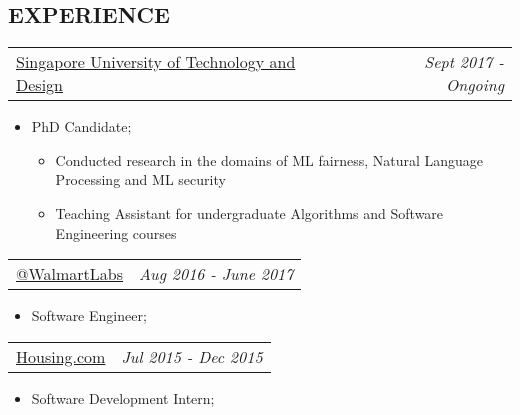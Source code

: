 \documentclass[margin]{res}
\begin{document}
\begin{resume}
\section{EXPERIENCE}

 \begin{tabular}{p{4.2in} r} 
                    \href{https://www.sutd.edu.sg}{Singapore University of Technology and Design} &  \textit{Sept 2017 - Ongoing} 
                    \end{tabular}
                     \begin{itemize}
                        \item[] PhD Candidate;
                        \begin{itemize}
                       \item[] Conducted research in the domains of ML fairness, Natural Language Processing and ML security
                       \item[] Teaching Assistant for undergraduate Algorithms and Software Engineering courses                                             
                        \end{itemize}
                     \end{itemize}

                    \begin{tabular}{p{4.2in} r} 
                    \href{http://www.walmartlabs.com/}{@WalmartLabs} &  \textit{Aug 2016 - June 2017} 
                    \end{tabular}
                     \begin{itemize}
                        \item[] Software Engineer;
                        
                        
                     \end{itemize}
                     
                    
                    
					\begin{tabular}{p{4.2in} r} 
					\href{https://housing.com/in}{Housing.com} &  \textit{Jul 2015 - Dec 2015} 
					 \end{tabular}	
                   \begin{itemize} %
                    \item[] Software Development Intern; 
%                        
					 \end{itemize} 
                      

\end{resume}
\end{document}
